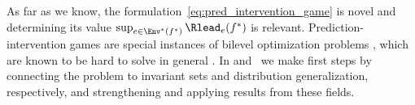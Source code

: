 As far as we know, the formulation~\eqref{eq:pred_intervention_game} is novel and determining 
its value 
$\sup_{e \in \Env^*(f^*)} \Rlead_e(f^*)$ 
% 
is relevant. 
Prediction-intervention games are special instances of bilevel optimization problems \citep{zhangIntroductionBilevelOptimization2024}, which are known to be hard to solve in general \citep{bolteGeometricComputationalHardness2026}.
In  and~
we 
make first steps by connecting the problem to invariant sets and distribution generalization, respectively, and strengthening and applying results from these fields.


